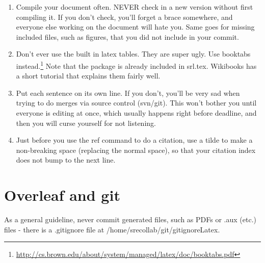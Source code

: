 \documentclass{sigchi}
\begin{document}
\begin{enumerate}

\item
Compile your document often.
NEVER check in a new version without first compiling it.
If you don't check, you'll forget a brace somewhere, and everyone else working on the document will hate you.
Same goes for missing included files, such as figures, that you did not include in your commit.

\item
Don't ever use the built in latex tables.
They are super ugly.
Use booktabs instead.\footnote{\url{http://cs.brown.edu/about/system/managed/latex/doc/booktabs.pdf}}
Note that the package is already included in srl.tex.
Wikibooks has a short tutorial that explains them fairly well.
\item
Put each sentence on its own line.
If you don't, you'll be very sad when trying to do merges via source control (svn/git).
This won't bother you until everyone is editing at once, which usually happens right before deadline, and then you will curse yourself for not listening.

\item
Just before you use the ref command to do a citation, use a tilde to make a non-breaking space (replacing the normal space), so that your citation index does not bump to the next line.

\end{enumerate}

\section{Overleaf and git}

As a general guideline, never commit generated files, such as PDFs or .aux (etc.) files - there is a .gitignore file at /home/srecollab/git/gitignoreLatex.
\end{document}
